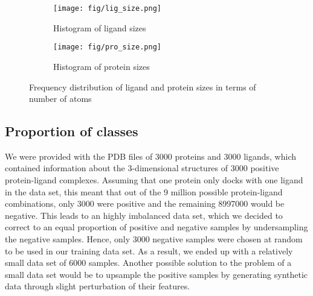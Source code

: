 \documentclass[11pt]{article}
\begin{document}
\begin{figure}[htb]
     \centering
     \begin{subfigure}[t]{0.49\textwidth}
         \texttt{[image: fig/lig\_size.png]}
         \caption{Histogram of ligand sizes}
         \label{fig:lig_size}
     \end{subfigure}
     \hfill
     \begin{subfigure}[t]{0.49\textwidth}
         \texttt{[image: fig/pro\_size.png]}
         \caption{Histogram of protein sizes}
         \label{fig:pro_size}
     \end{subfigure}

    \caption{Frequency distribution of ligand and protein sizes in terms of number of atoms}
    \label{fig:hist_sizes}
\end{figure}

\subsection{Proportion of classes}
We were provided with the PDB files of 3000 proteins and 3000 ligands, which contained information about the 3-dimensional structures of 3000 positive protein-ligand complexes. Assuming that one protein only docks with one ligand in the data set, this meant that out of the 9 million possible protein-ligand combinations, only 3000 were positive and the remaining 8997000 would be negative. This leads to an highly imbalanced data set, which we decided to correct to an equal proportion of positive and negative samples by undersampling the negative samples. Hence, only 3000 negative samples were chosen at random to be used in our training data set. As a result, we ended up with a relatively small data set of 6000 samples. Another possible solution to the problem of a small data set would be to upsample the positive samples by generating synthetic data through slight perturbation of their features.
\end{document}
